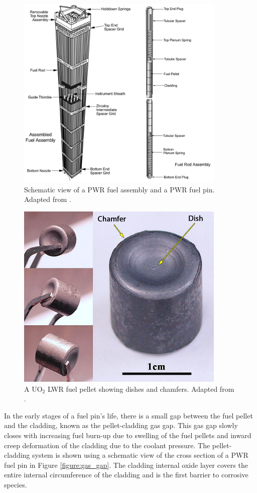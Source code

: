 \begin{figure}[ht]
\centering
\includegraphics[width=10cm]{images/fuelassembly.png}
\caption[Schematic view of a PWR fuel assembly and a PWR fuel pin.]{Schematic view of a PWR fuel assembly and a PWR fuel pin. Adapted from \cite{Croff2003}.}
\label{figure:fuelassembly}
\end{figure} 

\begin{figure}[ht]
\centering
\includegraphics[width=10cm]{images/fuelpellet.png}
\caption[A UO$_{2}$ LWR fuel pellet showing dishes and chamfers.]{A UO$_{2}$ LWR fuel pellet showing dishes and chamfers. Adapted from \cite{tulenko2013development}.}
\label{figure:fuelpellet}
\end{figure}

In the early stages of a fuel pin's life, there is a small gap between the fuel pellet and the cladding, known as the pellet-cladding gas gap. This gas gap slowly closes with increasing fuel burn-up due to swelling of the fuel pellets and inward creep deformation of the cladding due to the coolant pressure. The pellet-cladding system is shown using a schematic view of the cross section of a PWR fuel pin in Figure \ref{figure:gas_gap}. The cladding internal oxide layer covers the entire internal circumference of the cladding and is the first barrier to corrosive species. 

